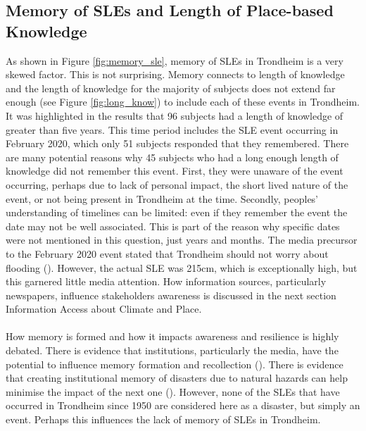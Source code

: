 \subsection{Memory of SLEs and Length of Place-based Knowledge}
As shown in Figure \ref{fig:memory_sle}, memory of SLEs in Trondheim is a very skewed factor. This is not surprising. Memory connects to length of knowledge and the length of knowledge for the majority of subjects does not extend far enough (see Figure \ref{fig:long_know}) to include each of these events in Trondheim. It was highlighted in the results that 96 subjects had a length of knowledge of greater than five years. This time period includes the SLE event occurring in February 2020, which only 51 subjects responded that they remembered. There are many potential reasons why 45 subjects who had a long enough length of knowledge did not remember this event. First, they were unaware of the event occurring, perhaps due to lack of personal impact, the short lived nature of the event, or not being present in Trondheim at the time. Secondly, peoples' understanding of timelines can be limited: even if they remember the event the date may not be well associated. This is part of the reason why specific dates were not mentioned in this question, just years and months. The media precursor to the February 2020 event stated that Trondheim should not worry about flooding (\cite{baisotti_danger_2020}). However, the actual SLE was 215cm, which is exceptionally high, but this garnered little media attention. How information sources, particularly newspapers, influence stakeholders awareness is discussed in the next section Information Access about Climate and Place.
\paragraph{}
How memory is formed and how it impacts awareness and resilience is highly debated. There is evidence that institutions, particularly the media, have the potential to influence memory formation and recollection (\cite{de_guttry_expiry_2022}). There is evidence that creating institutional memory of disasters due to natural hazards can help minimise the impact of the next one (\cite{de_guttry_expiry_2022}). However, none of the SLEs that have occurred in Trondheim since 1950 are considered here as a disaster, but simply an event. Perhaps this influences the lack of memory of SLEs in Trondheim. 
\paragraph{}

